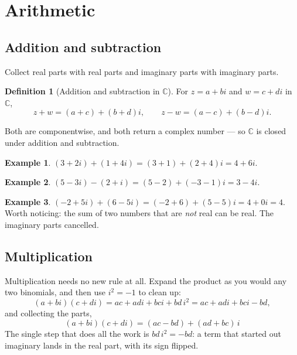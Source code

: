 \documentclass[11pt]{article}
\theoremstyle{definition}
\newtheorem{defn}{Definition}
\newtheorem{ex}{Example}
\theoremstyle{remark}
\newcommand{\C}{\mathbb{C}}
\begin{document}
\section{Arithmetic}
\subsection{Addition and subtraction}
Collect real parts with real parts and imaginary parts with imaginary parts.

\begin{defn}[Addition and subtraction in $\C$]
For $z=a+bi$ and $w=c+di$ in $\C$,
\[
  z+w = (a+c)+(b+d)i,
  \qquad
  z-w = (a-c)+(b-d)i .
\]
\end{defn}

\noindent Both are componentwise, and both return a complex number --- so $\C$
is closed under addition and subtraction.

\begin{ex}
$(3+2i)+(1+4i) = (3+1)+(2+4)i = 4+6i$.
\end{ex}

\begin{ex}
$(5-3i)-(2+i) = (5-2)+(-3-1)i = 3-4i$.
\end{ex}

\begin{ex}
$(-2+5i)+(6-5i) = (-2+6)+(5-5)i = 4+0i = 4$. \\
Worth noticing: the sum of two numbers that are \emph{not} real can be real. The
imaginary parts cancelled.
\end{ex}

\subsection{Multiplication}
Multiplication needs no new rule at all. Expand the product as you would any two
binomials, and then use $i^{2}=-1$ to clean up:
\[
  (a+bi)(c+di)
  = ac + adi + bci + bd\,i^{2}
  = ac + adi + bci - bd ,
\]
and collecting the parts,
\[
  \boxed{\;(a+bi)(c+di) = (ac-bd) + (ad+bc)\,i\;}
\]
The single step that does all the work is $bd\,i^{2}=-bd$: a term that started
out imaginary lands in the real part, with its sign flipped.
\end{document}
